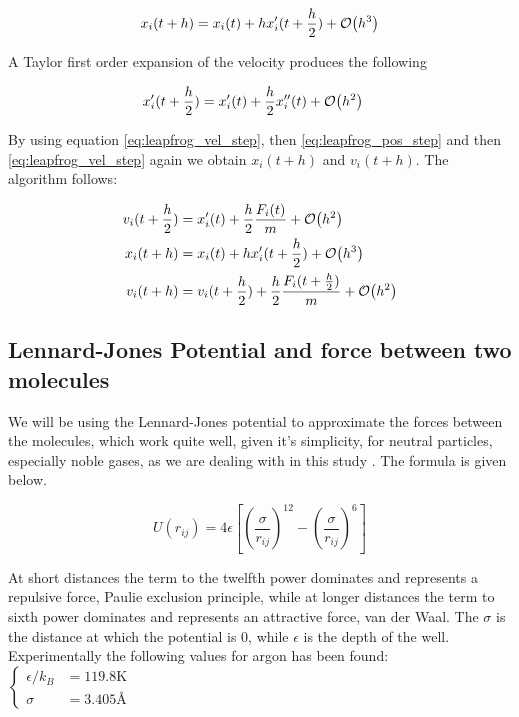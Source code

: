 \documentclass[11pt]{article}
\begin{document}
		\begin{equation}
		x_{i}(t+h) = x_i(t) + hx_i'(t+ \frac{h}{2})+ \order{h^3} \label{eq:leapfrog_pos_step}
		\end{equation}

		\noindent A Taylor first order expansion of the velocity produces the following

		\begin{align}
			x'_i(t+\frac{h}{2}) &= x_i'(t)  + \frac{h}{2}x_i''(t) + \order{h^2} \label{eq:leapfrog_vel_step}
		\end{align}

		\noindent By using equation \eqref{eq:leapfrog_vel_step}, then \eqref{eq:leapfrog_pos_step} and then \eqref{eq:leapfrog_vel_step} again we obtain \(x_i(t+h)\) and \(v_i(t+h)\). The algorithm follows:

		\begin{align*}
		v_i(t+\frac{h}{2}) &= x_i'(t)  + \frac{h}{2}\frac{F_i(t)}{m} + \order{h^2} 
		\\
		x_i(t+h) &= x_i(t) + hx_i'(t+ \frac{h} {2} ) + \order{h ^ 3}
		\\
		v_i(t+h) &= v_i(t+\frac{h}{2})  +  \frac{h}{2}\frac{F_i(t+ \frac{h}{2})}{m} + \order{h^2} 
		\end{align*}


	\subsection{Lennard-Jones Potential and force between two molecules}
		We will be using the Lennard-Jones potential to approximate the forces between the molecules, which work quite well, given it's simplicity, for neutral particles, especially noble gases, as we are dealing with in this study \cite{Wiki}. The formula is given below.

		\[
		U(r_{ij}) = 4 \epsilon \left[ \left( \frac{\sigma}{r_{ij}} \right)^{12} - \left( \frac{\sigma}{r_{ij}} \right)^{6} \right]
		\]
		
		At short distances the term to the twelfth power dominates and represents a repulsive force, Paulie exclusion principle, while at longer distances the term to sixth power dominates and represents an attractive force, van der Waal. The \(\sigma \) is the distance at which the potential is \(0\), while \( \epsilon  \) is the depth of the well. \\
		Experimentally the following values for argon has been found: 
		\(
		\begin{cases}
		\epsilon/k_B &= 119.8 \text{K} 
		\\
		\sigma &= 3.405 \text{\AA}
		\end{cases}
		\)
\end{document}
